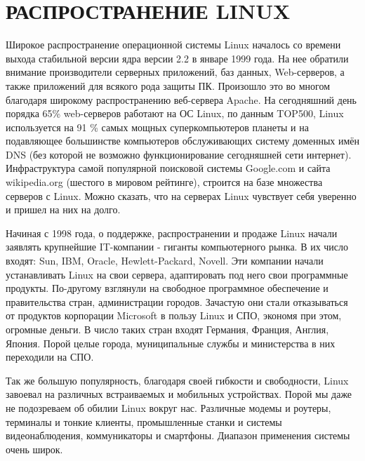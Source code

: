 \documentclass[bachelor, och, referat, times]{SCWorks}
\begin{document}
\section{РАСПРОСТРАНЕНИЕ LINUX}
\par Широкое распространение операционной системы Linux началось со времени выхода стабильной версии ядра версии 2.2 в январе 1999 года. На нее обратили внимание производители серверных приложений, баз данных, Web-серверов, а также приложений для всякого рода защиты ПК. Произошло это во многом благодаря широкому распространению веб-сервера Apache. На сегодняшний день порядка 65\% web-серверов работают на ОС Linux, по данным TOP500, Linux используется на 91 \% самых мощных суперкомпьютеров планеты и на подавляющее большинстве компьютеров обслуживающих систему доменных имён DNS (без которой не возможно функционирование сегодняшней сети интернет). Инфраструктура самой популярной поисковой системы Google.com и сайта wikipedia.org (шестого в мировом рейтинге), строится на базе множества серверов с Linux. Можно сказать, что на серверах Linux чувствует себя уверенно и пришел на них на долго.
\par Начиная с 1998 года, о поддержке, распространении и продаже Linux начали заявлять крупнейшие IT-компании - гиганты компьютерного рынка. В их число входят: Sun, IBM, Oracle, Hewlett-Packard, Novell. Эти компании начали устанавливать Linux на свои сервера, адаптировать под него свои программные продукты. По-другому взглянули на свободное программное обеспечение и правительства стран, администрации городов. Зачастую они стали отказываться от продуктов корпорации Microsoft в пользу Linux и СПО, экономя при этом, огромные деньги. В число таких стран входят Германия, Франция, Англия, Япония. Порой целые города, муниципальные службы и министерства в них переходили на СПО.
\par Так же большую популярность, благодаря своей гибкости и свободности, Linux завоевал на различных встраиваемых и мобильных устройствах. Порой мы даже не подозреваем об обилии Linux вокруг нас. Различные модемы и роутеры, терминалы и тонкие клиенты, промышленные станки и системы видеонаблюдения, коммуникаторы и смартфоны. Диапазон применения системы очень широк.
\end{document}
